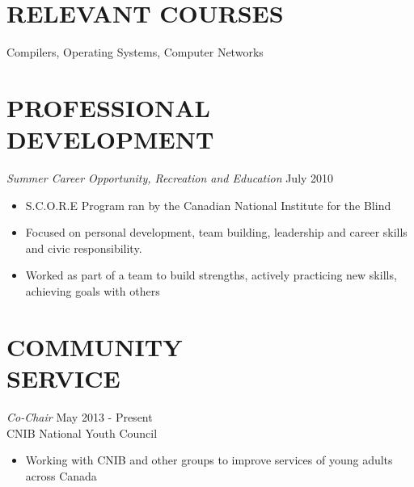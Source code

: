 \documentclass[margin]{res}
\begin{document}
\begin{resume}


\section{RELEVANT COURSES}
Compilers, Operating Systems, Computer Networks

\section{PROFESSIONAL DEVELOPMENT} 
{\sl Summer Career Opportunity, Recreation and Education} \hfill July 2010
\begin{itemize} \itemsep -2pt
  \item S.C.O.R.E Program ran by the Canadian National Institute for the Blind
  \item Focused on personal development, team building, leadership and career skills and civic responsibility.
  \item Worked as part of a team to build strengths, actively practicing new skills, achieving goals with others
\end{itemize}

\section{COMMUNITY \\ SERVICE}  
{\sl Co-Chair} \hfill May 2013 - Present\\
CNIB National Youth Council
\begin{itemize}\itemsep -2pt
  \item Working with CNIB and other groups to improve services of young adults across Canada
\end{itemize}


\end{resume}
\end{document}
